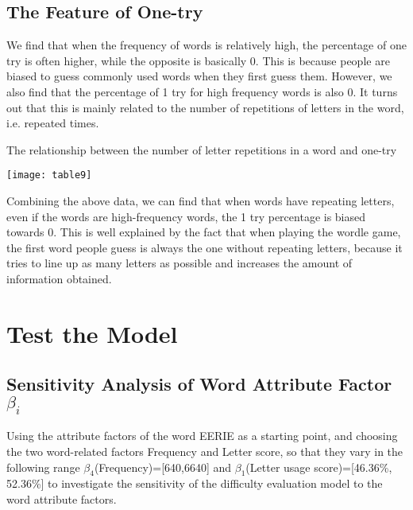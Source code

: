 \documentclass[12pt]{mcmthesis}
\begin{document}
\subsection{The Feature of One-try}
\hspace{1.4em}We find that when the frequency of words is relatively high, the percentage of one try is often higher, while the opposite is basically 0. This is because people are biased to guess commonly used words when they first guess them.
However, we also find that the percentage of 1 try for high frequency words is also 0. It turns out that this is mainly related to the number of repetitions of letters in the word, i.e. repeated times.
\begin{table}[!htbp]
	\small
	\centering
	\caption{The relationship between the number of letter repetitions in a word and one-try}
	\texttt{[image: table9]}
	\label{tab:7}
\end{table}

Combining the above data, we can find that when words have repeating letters, even if the words are high-frequency words, the 1 try percentage is biased towards 0. This is well explained by the fact that when playing the wordle game, the first word people guess is always the one without repeating letters, because it tries to line up as many letters as possible and increases the amount of information obtained.
\\[0.01pt]
\section{Test the Model}
\subsection{Sensitivity Analysis of Word Attribute Factor $ \beta_{i} $}
\hspace{1.4em}Using the attribute factors of the word EERIE as a starting point, and choosing the two word-related factors Frequency and Letter score, so that they vary in the following range
$ \beta_{4} $(Frequency)=[640,6640] and $ \beta_{1} $(Letter usage score)=[46.36\%, 52.36\%] to investigate the sensitivity of the difficulty evaluation model to the word attribute factors.
\end{document}
